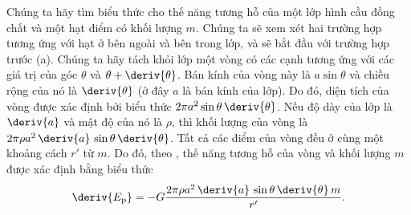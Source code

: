 Chúng ta hãy tìm biểu thức cho thế năng tương hỗ của một lớp hình cầu đồng chất và một hạt điểm có khối lượng $m$. Chúng ta sẽ xem xét hai trường hợp tương ứng với hạt ở bên ngoài và bên trong lớp, và sẽ bắt đầu với trường hợp trước (a). Chúng ta hãy tách khỏi lớp một vòng có các cạnh tương ứng với các giá trị của góc $\theta$ và $\theta+\deriv{\theta}$. Bán kính của vòng này là  $a\sin\theta$ và chiều rộng của nó là $\deriv{\theta}$ (ở đây $a$ là bán kính của lớp). Do đó, diện tích của vòng được xác định bởi biểu thức $2\pi a^2\sin\theta\,\deriv{\theta}$. Nếu độ dày của lớp là $\deriv{a}$ và mật độ của nó là $\rho$, thì khối lượng của vòng là $2\pi\rho a^2\,\deriv{a}\,\sin\theta\,\deriv{\theta}$. Tất cả các điểm của vòng đều ở cùng một khoảng cách $r'$ từ $m$. Do đó, theo , thế năng tương hỗ của vòng và khối lượng $m$ được xác định bằng biểu thức
\begin{equation}\label{eq:6_13}
	\deriv{E_{\text{p}}} = -G\frac{2\pi\rho a^2\,\deriv{a}\,\sin\theta\,\deriv{\theta}\,m}{r'}.
\end{equation}

